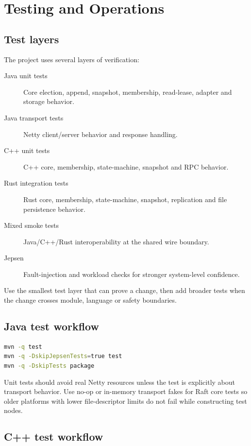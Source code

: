 \section{Testing and Operations}
\label{sec:TestingAndOperations}

\subsection{Test layers}

The project uses several layers of verification:

\begin{description}
\item[Java unit tests] Core election, append, snapshot, membership, read-lease,
adapter and storage behavior.
\item[Java transport tests] Netty client/server behavior and response handling.
\item[C++ unit tests] C++ core, membership, state-machine, snapshot and RPC behavior.
\item[Rust integration tests] Rust core, membership, state-machine, snapshot,
replication and file persistence behavior.
\item[Mixed smoke tests] Java/C++/Rust interoperability at the shared wire boundary.
\item[Jepsen] Fault-injection and workload checks for stronger system-level confidence.
\end{description}

Use the smallest test layer that can prove a change, then add broader tests when
the change crosses module, language or safety boundaries.

\subsection{Java test workflow}

\begin{lstlisting}[language=bash,caption={Java test workflow}]
mvn -q test
mvn -q -DskipJepsenTests=true test
mvn -q -DskipTests package
\end{lstlisting}

Unit tests should avoid real Netty resources unless the test is explicitly about
transport behavior. Use no-op or in-memory transport fakes for Raft core tests so
older platforms with lower file-descriptor limits do not fail while constructing
test nodes.

\subsection{C++ test workflow}

